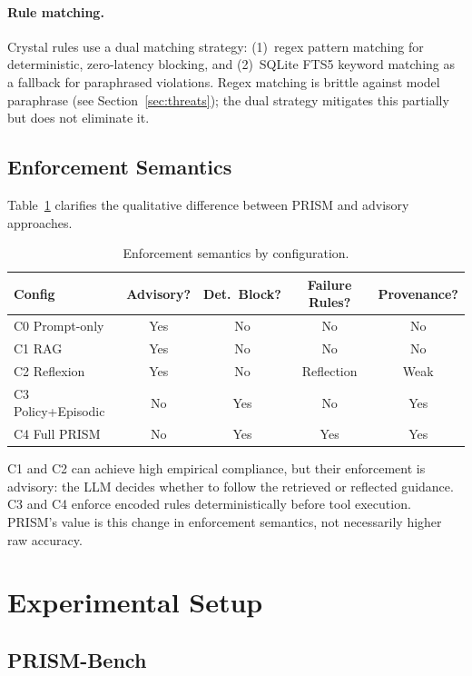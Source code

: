 \documentclass[11pt]{article}
\begin{document}
\paragraph{Rule matching.}
Crystal rules use a dual matching strategy:
(1)~regex pattern matching for deterministic, zero-latency blocking,
and (2)~SQLite FTS5 keyword matching as a fallback for paraphrased violations.
Regex matching is brittle against model paraphrase (see Section~\ref{sec:threats});
the dual strategy mitigates this partially but does not eliminate it.

\subsection{Enforcement Semantics}

Table~\ref{tab:semantics} clarifies the qualitative difference
between PRISM and advisory approaches.

\begin{table}[h]
\centering
\caption{Enforcement semantics by configuration.}
\label{tab:semantics}
\small
\begin{tabular}{@{}lcccc@{}}
\toprule
Config & Advisory? & Det.\ Block? & Failure Rules? & Provenance? \\
\midrule
C0 Prompt-only    & Yes & No  & No  & No \\
C1 RAG            & Yes & No  & No  & No \\
C2 Reflexion      & Yes & No  & Reflection & Weak \\
C3 Policy+Episodic & No  & Yes & No  & Yes \\
C4 Full PRISM     & No  & Yes & Yes & Yes \\
\bottomrule
\end{tabular}
\end{table}

\noindent C1 and C2 can achieve high empirical compliance,
but their enforcement is advisory:
the LLM decides whether to follow the retrieved or reflected guidance.
C3 and C4 enforce encoded rules deterministically before tool execution.
PRISM's value is this change in enforcement semantics,
not necessarily higher raw accuracy.

\section{Experimental Setup}
\label{sec:experiments}

\subsection{PRISM-Bench}
\end{document}
